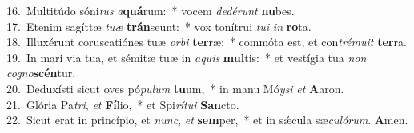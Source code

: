 {16.~}Multitúdo sóni\textit{tus} \textit{a}\textbf{quá}rum:~* vocem \textit{de}\textit{dé}\textit{runt} \textbf{nu}bes.\\
{17.~}Etenim sagíttæ \textit{tu}\textit{æ} \textbf{trán}seunt:~* vox tonítrui \textit{tu}\textit{i} \textit{in} \textbf{ro}ta.\\
{18.~}Illuxérunt coruscatiónes tuæ \textit{or}\textit{bi} \textbf{ter}ræ:~* commóta est, et con\textit{tré}\textit{mu}\textit{it} \textbf{ter}ra.\\
{19.~}In mari via tua, et sémitæ tuæ in \textit{a}\textit{quis} \textbf{mul}tis:~* et vestígia tua \textit{non} \textit{co}\textit{gno}\textbf{scén}tur.\\
{20.~}Deduxísti sicut oves pó\textit{pu}\textit{lum} \textbf{tu}um,~* in manu Mó\textit{y}\textit{si} \textit{et} \textbf{A}aron.\\
{21.~}Glória Pa\textit{tri}, \textit{et} \textbf{Fí}lio,~* et Spi\textit{rí}\textit{tu}\textit{i} \textbf{San}cto.\\
{22.~}Sicut erat in princípio, et \textit{nunc}, \textit{et} \textbf{sem}per,~* et in sǽcula sæ\textit{cu}\textit{ló}\textit{rum}. \textbf{A}men.\\
